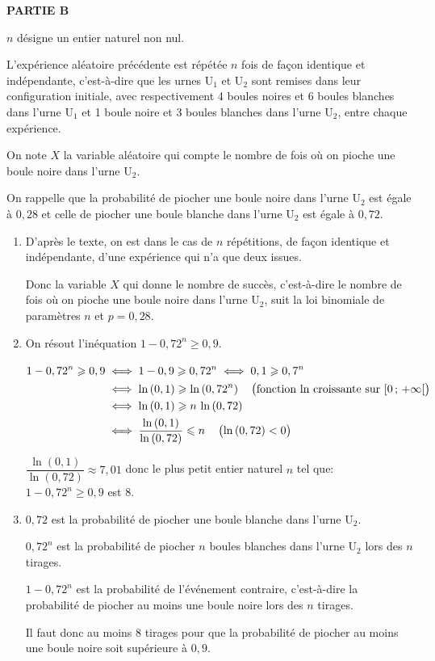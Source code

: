 \documentclass[10pt]{article}
\begin{document}
\bigskip

\textbf{PARTIE B}

\medskip

$n$ désigne un entier naturel non nul.

L'expérience aléatoire précédente est répétée $n$ fois de façon identique et indépendante, c'est-à-dire que les urnes U$_1$ et U$_2$ sont remises dans leur configuration initiale, avec respectivement 4 boules noires et 6 boules blanches dans l'urne U$_1$ et 1 boule noire et 3 boules blanches dans l'urne U$_2$, entre chaque expérience.

On note $X$ la variable aléatoire qui compte le nombre de fois où on pioche une boule noire dans l'urne U$_2$.

On rappelle que la probabilité de piocher une boule noire dans l'urne U$_2$ est égale à $0,28$ et celle de piocher une boule blanche dans l'urne U$_2$ est égale à $0,72$.

\medskip

\begin{enumerate}
\item 
D'après le texte, on est dans le cas de $n$ répétitions,  de façon identique et indépendante, d'une expérience qui n'a que deux issues.

Donc la variable $X$ qui donne le nombre de succès, c'est-à-dire le nombre  de fois où on pioche une boule noire dans l'urne U$_2$, suit la loi binomiale de paramètres $n$ et $p= 0,28$.

\item 
On résout l'inéquation $1 - 0,72^n \geqslant 0,9.$

$\begin{aligned}[t]
1 - 0,72^n \geqslant 0,9
& \iff 1-0,9 \geqslant 0,72^n
\iff 0,1 \geqslant 0,7^n\\
& \iff \ln\left (0,1\right ) \geqslant \ln \left ( 0,72^n\right ) \quad \left (\text{fonction ln croissante sur }[0\,;\,+\infty[\strut\right )\\
& \iff \ln\left (0,1\right ) \geqslant n\,\ln \left ( 0,72\right )\\
& \iff \dfrac{\ln\left (0,1\right )}{\ln \left ( 0,72\right )} \leqslant n \quad \left (\ln\left (0,72\right )<0\strut\right )
\end{aligned}$

$ \dfrac{\ln\left (0,1\right )}{\ln \left ( 0,72\right )} \approx 7,01$ donc le plus petit entier naturel $n$ tel que:  $1 - 0,72^n \geqslant 0,9$ est 8.

\item
$0,72$ est la probabilité de piocher une boule blanche dans l'urne U$_2$.

$0,72^n$ est la probabilité de piocher $n$ boules blanches dans l'urne U$_2$ lors des $n$ tirages.

$1-0,72^n$ est la probabilité de l'événement contraire, c'est-à-dire la probabilité de piocher au moins une boule noire lors des $n$ tirages.

Il faut donc au moins 8 tirages pour que la probabilité de piocher au moins une boule noire soit supérieure à $0,9$.

\end{enumerate}
\end{document}
